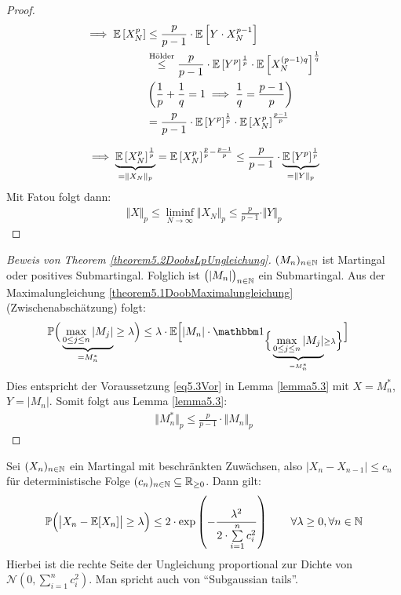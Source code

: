 \begin{proof}
	\begin{align*}
		\implies
		\mathbb{E}\left[X_N^p\right]
		&\leq \frac{p}{p-1}\cdot\mathbb{E}\left[Y\cdot X_N^{p-1}\right] \\
		&\stackrel{\text{Hölder}}{\leq}
		\frac{p}{p-1}\cdot\mathbb{E}\left[Y^p\right]^{\frac{1}{p}}\cdot\mathbb{E}\left[X_N^{(p-1)q}\right]^{\frac{1}{q}}\\
		&\left(\frac{1}{p} + \frac{1}{q} = 1 \implies \frac{1}{q} = \frac{p-1}{p}\right) \\
		&=\frac{p}{p-1}\cdot\mathbb{E}\left[Y^p\right]^{\frac{1}{p}}\cdot\mathbb{E}\left[X_N^{p}\right]^{\frac{p-1}{p}}
	\end{align*}
	
	\begin{align*}
		\implies
		\underbrace{\mathbb{E}\left[X_N^p\right]^{\frac{1}{p}}}_{=\Vert X_N\Vert_p}
		=\mathbb{E}\left[X_N^p\right]^{\frac{p}{p}-\frac{p-1}{p}}
		\leq
		\frac{p}{p-1}\cdot\underbrace{\mathbb{E}\left[Y^p\right]^{\frac{1}{p}}}_{=\Vert Y\Vert_p}
	\end{align*}
	Mit Fatou folgt dann:
	\begin{align*}
		\Vert X\Vert_p\leq\liminf\limits_{N\to\infty}\Vert X_N\Vert_p\leq\frac{p}{p-1}\cdot\Vert Y\Vert_p
	\end{align*}
\end{proof}

\begin{proof}[Beweis von Theorem \ref{theorem5.2DoobsLpUngleichung}]\enter
	$(M_n)_{n\in\mathbb{N}}$ ist Martingal oder positives Submartingal.
	Folglich ist $\big(|M_n|\big)_{n\in\mathbb{N}}$ ein Submartingal.
	Aus der Maximalungleichung 	\ref{theorem5.1DoobMaximalungleichung} (Zwischenabschätzung) folgt:
	\begin{align*}
		\P\Big(\underbrace{\max\limits_{0\leq j\leq n}|M_j|}_{=M_n^\ast}\geq\lambda\Big)
		&\leq\lambda\cdot\E\Big[|M_n|\cdot\indi_{\Big\lbrace\underbrace{\max\limits_{0\leq j\leq n}|M_j|}_{=M_n^\ast}\geq\lambda\Big\rbrace}\Big]
	\end{align*}
	Dies entspricht der Voraussetzung \eqref{eq5.3Vor} in Lemma \ref{lemma5.3} mit $X=M_n^\ast$, $Y=|M_n|$. Somit folgt aus Lemma \ref{lemma5.3}:
	\begin{align*}
		\big\Vert M_n^\ast\big\Vert_p\leq\frac{p}{p-1}\cdot\big\Vert M_n\big\Vert_p
	\end{align*}
\end{proof}

\begin{theorem}\label{theorem5.4AzumasUngleichung}\enter
	Sei $(X_n)_{n\in\mathbb{N}}$ ein Martingal mit beschränkten Zuwächsen, also $\big|X_n-X_{n-1}\big|\leq c_n$ für deterministische Folge $(c_n)_{n\in\mathbb{N}}\subseteq\mathbb{R}_{\geq0}$. Dann gilt:
	\begin{align*}
		\mathbb{P}\Big(\big|X_n-\mathbb{E}[X_n]\big|\geq\lambda\Big)\leq2\cdot\exp\left(-\frac{\lambda^2}{2\cdot\sum\limits_{i=1}^n c_i^2}\right)\qquad\forall\lambda\geq0,\forall n\in\mathbb{N}
	\end{align*}
	Hierbei ist die rechte Seite der Ungleichung proportional zur Dichte von $\mathcal{N}\left(0,\sum\limits_{i=1}^n c_i^2\right)$.
	Man spricht auch von ``Subgaussian tails''.
\end{theorem}


